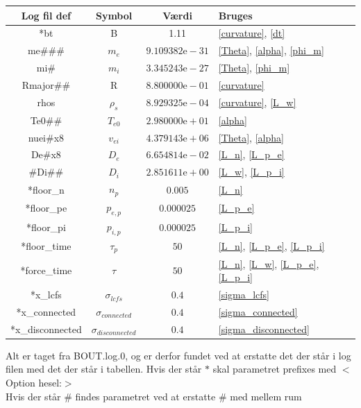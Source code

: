 \documentclass{article}
\begin{document}
\begin{center}
\begin{tabular}{|c|c|c|l|}
    \hline
    \textbf{Log fil def} & \textbf{Symbol} & \textbf{Værdi} & \textbf{Bruges}\\ \hline
    *bt & B & 1.11 & \ref{curvature}, \ref{dt} \\ \hline
    me\#\#\# & $m_e$ & $9.109382\text{e}-31$ & \ref{Theta}, \ref{alpha}, \ref{phi_m} \\ \hline
    mi\# & $m_i$ & $3.345243\text{e}-27$ & \ref{Theta}, \ref{phi_m} \\ \hline
    Rmajor\#\# & R & $8.800000\text{e}-01$ & \ref{curvature} \\ \hline
    rhos & $\rho_s$ & $8.929325\text{e}-04$ & \ref{curvature}, \ref{L_w} \\ \hline
    Te0\#\#  & $T_{e0}$ & $2.980000\text{e}+01$ & \ref{alpha} \\ \hline
    nuei\#x8 & $v_{ei}$ & $4.379143\text{e}+06$ & \ref{Theta}, \ref{alpha} \\ \hline
    De\#x8 & $D_e$ & $6.654814\text{e}-02$ & \ref{L_n}, \ref{L_p_e} \\ \hline
    \#Di\#\# & $D_i$ & $2.851611\text{e}+00$ & \ref{L_w}, \ref{L_p_i} \\ \hline
    *floor\_n & $n_p$ & $0.005$ & \ref{L_n} \\ \hline
    *floor\_pe & $p_{e,p}$ & $0.000025$ & \ref{L_p_e} \\ \hline
    *floor\_pi & $p_{i,p}$ & $0.000025$ & \ref{L_p_i} \\ \hline
    *floor\_time & $\tau_p$ & $50$ & \ref{L_n}, \ref{L_p_e}, \ref{L_p_i} \\ \hline
    *force\_time & $\tau$ & $50$ & \ref{L_n}, \ref{L_w}, \ref{L_p_e}, \ref{L_p_i} \\ \hline
    *x\_lcfs & $\sigma_{lcfs}$ & $0.4$ & \ref{sigma_lcfs} \\ \hline
    *x\_connected & $\sigma_{connected}$ & $0.4$ & \ref{sigma_connected} \\ \hline
    *x\_disconnected & $\sigma_{disconnected}$ & $0.4$ & \ref{sigma_disconnected} \\ \hline
\end{tabular}
\end{center}

Alt er taget fra BOUT.log.0, og er derfor fundet ved at erstatte det der står i log filen med det der står i tabellen.
Hvis der står $*$ skal parametret prefixes med $<$Option hesel:$>$ \\ \ignorespaces
Hvis der står \# findes parametret ved at erstatte \# med mellem rum
\end{document}
